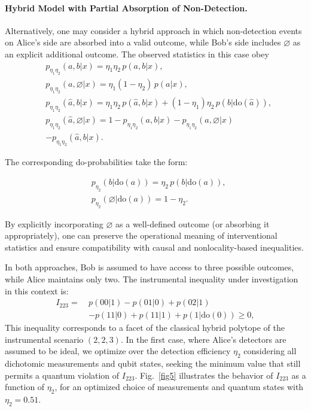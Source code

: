 \documentclass[aps,pra,reprint, superscriptaddress,showkeys]{revtex4-2}
\theoremstyle{plain}
\begin{document}
\paragraph{ Hybrid Model with Partial Absorption of Non-Detection.}
Alternatively, one may consider a hybrid approach in which non-detection events on Alice’s side are absorbed into a valid outcome, while Bob's side includes $\varnothing$ as an explicit additional outcome. The observed statistics in this case obey 
\begin{align}
&p_{\eta_1 \eta_2}(a, b | x) = \eta_1 \eta_2\, p(a, b | x), \nonumber \\
&p_{\eta_1 \eta_2}(a, \varnothing | x) = \eta_1(1 - \eta_2)\, p(a | x), \nonumber \\
&p_{\eta_1 \eta_2}(\hat a, b | x) = \eta_1 \eta_2\, p(\hat a, b | x) + (1 - \eta_1)\eta_2\, p(b | \text{do}(\hat a)), \nonumber \\
&p_{\eta_1 \eta_2}(\hat a, \varnothing | x) = 1 - p_{\eta_1 \eta_2}(a, b | x) -p_{\eta_1 \eta_2}(a, \varnothing | x) \nonumber \\&- p_{\eta_1 \eta_2}(\hat a, b | x).
\end{align}

The corresponding do-probabilities take the form:

\begin{align}
&p_{\eta_2}(b | \text{do}(a)) = \eta_2\, p(b | \text{do}(a)), \nonumber \\
&p_{\eta_2}(\varnothing | \text{do}(a)) = 1 - \eta_2.
\end{align}

By explicitly incorporating $\varnothing$ as a well-defined outcome (or absorbing it appropriately), one can preserve the operational meaning of interventional statistics and ensure compatibility with causal and nonlocality-based inequalities.


In both approaches, Bob is assumed to have access to three possible outcomes, while Alice maintains only two. The instrumental inequality under investigation in this context is:
\begin{equation}
\begin{aligned}
I_{223} =\ & p(00 | 1) - p(01 | 0) + p(02 | 1) \\
           & - p(11 | 0) + p(11 | 1) + p(1 | \text{do}(0)) \geq 0,
\end{aligned}
\end{equation}
This inequality corresponds to a facet of the classical hybrid polytope of the instrumental scenario $(2,2,3)$. In the first case, where Alice’s detectors are assumed to be ideal, we optimize over the detection efficiency $\eta_2$ considering all dichotomic measurements and qubit states, seeking the minimum value that still permits a quantum violation of $I_{223}$. Fig.~\ref{fig5} illustrates the behavior of $I_{223}$ as a function of $\eta_2$, for an optimized choice of measurements and quantum states with $\eta_2 = 0.51$.
\end{document}

